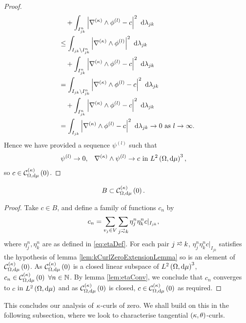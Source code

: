 \begin{proof}
\begin{align*}
		&\quad + \int_{I_{jk}^n}\left\lvert \nabla_{}^{(\kappa)}\wedge\phi^{(l)} - c \right\rvert^2 \ \mathrm{d}\lambda_{jk} \\
		&\leq \int_{I_{jk}\setminus I_{jk}^n}\left\lvert \nabla_{}^{(\kappa)}\wedge\phi^{(l)} \right\rvert^2 \ \mathrm{d}\lambda_{jk} \\
		&\quad + \int_{I_{jk}^n}\left\lvert \nabla_{}^{(\kappa)}\wedge\phi^{(l)} - c \right\rvert^2 \ \mathrm{d}\lambda_{jk} \\
		&= \int_{I_{jk}\setminus I_{jk}^n}\left\lvert \nabla_{}^{(\kappa)}\wedge\phi^{(l)} - c \right\rvert^2 \ \mathrm{d}\lambda_{jk} \\
		&\quad + \int_{I_{jk}^n}\left\lvert \nabla_{}^{(\kappa)}\wedge\phi^{(l)} - c \right\rvert^2 \ \mathrm{d}\lambda_{jk} \\
		&= \int_{I_{jk}}\left\lvert \nabla_{}^{(\kappa)}\wedge\phi^{(l)} - c \right\rvert^2 \ \mathrm{d}\lambda_{jk} \rightarrow 0 \ \text{as} \ l \rightarrow\infty.
	\end{align*}
	Hence we have provided a sequence $\psi^{(l)}$ such that
	\begin{align*}
		\psi^{(l)} \rightarrow 0, &\quad \nabla_{}^{(\kappa)}\wedge\psi^{(l)} \rightarrow c \text{ in } L^{2}\left( \Omega,\mathrm{d}\mu \right)^3,
	\end{align*}
	so $c\in\mathcal{C}_{ \Omega, \mathrm{d}\mu}^{(\kappa)}\left( 0 \right)$.
\end{proof}

\begin{lemma} \label{lem:BInkCurlZero}
	\begin{align*}
		B &\subset \mathcal{C}_{ \Omega, \mathrm{d}\mu}^{(\kappa)}\left( 0 \right).
	\end{align*}
\end{lemma}
\begin{proof}
	Take $c\in B$, and define a family of functions $c_n$ by
	\begin{align*}
		c_n &= \sum_{v_j\in V}\sum_{j\conLeft k}\eta_j^n \eta_k^n c\vert_{I_{jk}},
	\end{align*}
	where $\eta_j^n, \eta_k^n$ are as defined in \eqref{eq:etaDef}.
	For each pair $j\conLeft k$, $\eta_j^n \eta_k^n c\vert_{I_{jk}}$ satisfies the hypothesis of lemma \ref{lem:kCurlZeroExtensionLemma} so is an element of $\mathcal{C}_{ \Omega, \mathrm{d}\mu}^{(\kappa)}\left( 0 \right)$.
	As $\mathcal{C}_{ \Omega, \mathrm{d}\mu}^{(\kappa)}\left( 0 \right)$ is a closed linear subspace of $L^{2}\left( \Omega,\mathrm{d}\mu \right)^3$, $c_n\in\mathcal{C}_{ \Omega, \mathrm{d}\mu}^{(\kappa)}\left( 0 \right) \ \forall n\in\mathbb{N}$.
	By lemma \ref{lem:etaConv}, we conclude that $c_n$ converges to $c$ in $L^{2}\left( \Omega,\mathrm{d}\mu \right)$ and as $\mathcal{C}_{ \Omega, \mathrm{d}\mu}^{(\kappa)}\left( 0 \right)$ is closed, $c\in\mathcal{C}_{ \Omega, \mathrm{d}\mu}^{(\kappa)}\left( 0 \right)$ as required.
\end{proof}

This concludes our analysis of $\kappa$-curls of zero.
We shall build on this in the following subsection, where we look to characterise tangential $\left( \kappa, \theta \right)$-curls.

